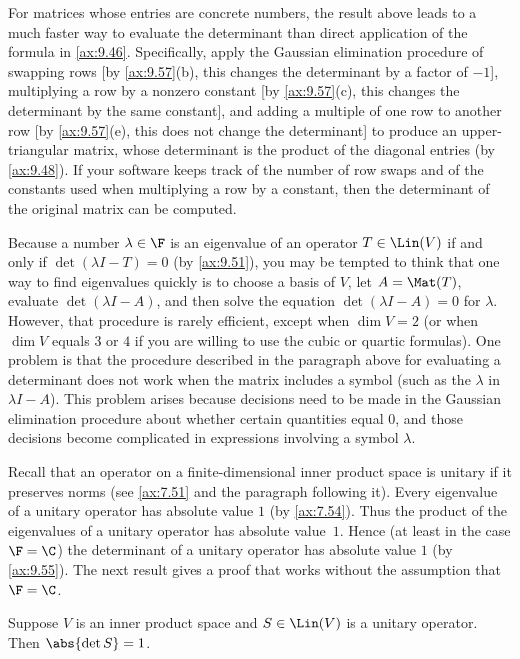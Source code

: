 For matrices whose entries are concrete numbers, the result above leads to a
much faster way to evaluate the determinant than direct application of the
formula in \ref{ax:9.46}. Specifically, apply the Gaussian elimination
procedure of swapping rows [by \ref{ax:9.57}(b), this changes the determinant
by a factor of $-1$], multiplying a row by a nonzero constant [by
\ref{ax:9.57}(c), this changes the determinant by the same constant], and
adding a multiple of one row to another row [by \ref{ax:9.57}(e), this does not
change the determinant] to produce an upper-triangular matrix, whose
determinant is the product of the diagonal entries (by \ref{ax:9.48}). If your
software keeps track of the number of row swaps and of the constants used when
multiplying a row by a constant, then the determinant of the original matrix
can be computed.

Because a number $\lambda\in\F$ is an eigenvalue of an operator $T\in\Lin(V)$
if and only if $\det(\lambda I-T)=0$ (by \ref{ax:9.51}), you may be tempted to
think that one way to find eigenvalues quickly is to choose a basis of $V$, let
$A=\Mat(T)$, evaluate $\det(\lambda I-A)$, and then solve the equation
$\det(\lambda I-A)=0$ for $\lambda$. However, that procedure is rarely
efficient, except when $\dim V=2$ (or when $\dim V$ equals $3$ or $4$ if you
are willing to use the cubic or quartic formulas). One problem is that the
procedure described in the paragraph above for evaluating a determinant does
not work when the matrix includes a symbol (such as the $\lambda$ in
$\lambda I-A$). This problem arises because decisions need to be made in the
Gaussian elimination procedure about whether certain quantities equal $0$, and
those decisions become complicated in expressions involving a symbol
$\lambda$.

Recall that an operator on a finite-dimensional inner product space is unitary
if it preserves norms (see \ref{ax:7.51} and the paragraph following it). Every
eigenvalue of a unitary operator has absolute value $1$ (by \ref{ax:7.54}).
Thus the product of the eigenvalues of a unitary operator has absolute
value~$1$. Hence (at least in the case $\F=\C$) the determinant of a unitary
operator has absolute value $1$ (by \ref{ax:9.55}). The next result gives a
proof that works without the assumption that $\F=\C$.

\begin{result}\label{ax:9.58}
Suppose $V$ is an inner product space and $S\in\Lin(V)$ is a unitary operator.
Then $\abs{\det S}=1$.
\end{result}

